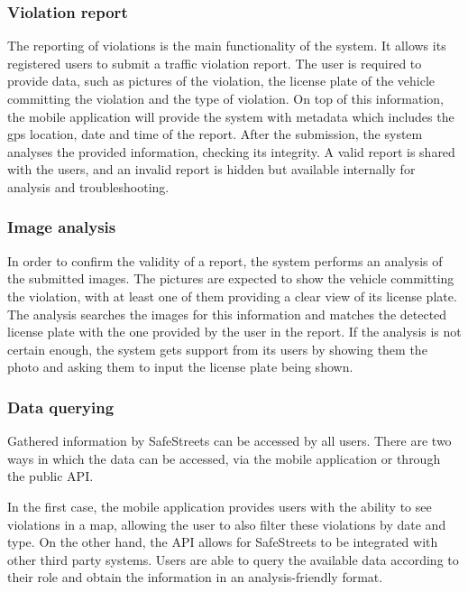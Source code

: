 \subsubsection{Violation report}
The reporting of violations is the main functionality of the system. It allows its registered users to submit a traffic violation report. The user is required to provide data, such as pictures of the violation, the license plate of the vehicle committing the violation and the type of violation. On top of this information, the mobile application will provide the system with metadata which includes the gps location, date and time of the report.
After the submission, the system analyses the provided information, checking its integrity. A valid report is shared with the users, and an invalid report is hidden but available internally for analysis and troubleshooting.

\subsubsection{Image analysis}
In order to confirm the validity of a report, the system performs an analysis of the submitted images. The pictures are expected to show the vehicle committing the violation, with at least one of them providing a clear view of its license plate. The analysis searches the images for this information and matches the detected license plate with the one provided by the user in the report. If the analysis is not certain enough, the system gets support from its users by showing them the photo and asking them to input the license plate being shown.

\subsubsection{Data querying}

Gathered information by SafeStreets can be accessed by all users. There are two ways in which the data can be accessed, via the mobile application or through the public API.

In the first case, the mobile application provides users with the ability to see violations in a map, allowing the user to also filter these violations by date and type. 
On the other hand, the API allows for SafeStreets to be integrated with other third party systems. Users are able to query the available data according to their role and obtain the information in an analysis-friendly format.

